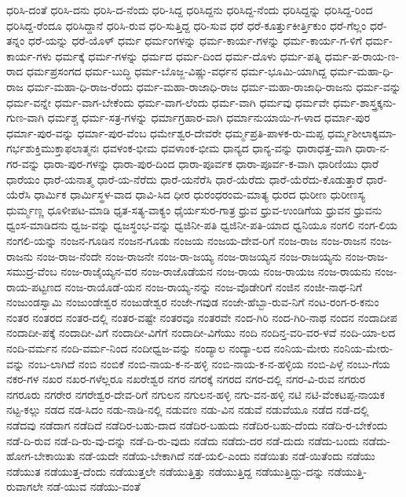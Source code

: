 {ಧರಿಸಿ-ದಂತೆ
ಧರಿಸಿ-ದನು
ಧರಿಸಿ-ದ-ನೆಂದು
ಧರಿ-ಸಿದ್ದ
ಧರಿಸಿದ್ದನು
ಧರಿಸಿದ್ದ-ನೆಂದು
ಧರಿಸಿದ್ದನ್ನು
ಧರಿಸಿದ್ದ-ರಿಂದ
ಧರಿಸಿದ್ದ-ರೆಂದೂ
ಧರಿಸಿದ್ದಾನೆ
ಧರಿಸಿ-ರುವ
ಧರಿ-ಸುತ್ತಿದ್ದ
ಧರಿ-ಸುವ
ಧರೆ
ಧರೆ-ಕೂರ್ತ್ತುಕೀರ್ತ್ತಿಕುಂ
ಧರೆ-ಗೆಲ್ಲಂ
ಧರೆ-ತನ್ನಂ
ಧರೆ-ಯನ್ನು
ಧರೆ-ಯೊಳ್
ಧರ್ಮ
ಧರ್ಮಂಗಳನ್ನು
ಧರ್ಮ-ಕಾರ್ಯ-ಗಳನ್ನು
ಧರ್ಮ-ಕಾರ್ಯ-ಗ-ಳಿಗೆ
ಧರ್ಮ-ಕಾರ್ಯ-ಗಳು
ಧರ್ಮಕ್ಕೆ
ಧರ್ಮ-ಗಳನ್ನು
ಧರ್ಮದ
ಧರ್ಮ-ದಿಂದ
ಧರ್ಮ-ದೊಳು
ಧರ್ಮ-ಪತ್ನಿ
ಧರ್ಮ-ಪ-ರಾಯ-ಣ-ರಾದ
ಧರ್ಮಪ್ರಸಂಗದ
ಧರ್ಮ-ಬುದ್ಧಿ
ಧರ್ಮ-ಬೊಜ್ಜ-ವಿಷ್ಣು-ವರ್ಧನ
ಧರ್ಮ-ಭೂಮಿ-ಯಾಗಿದ್ದ
ಧರ್ಮ-ಮಹಾ-ಧಿ-ರಾಜ
ಧರ್ಮ-ಮಹಾ-ಧಿ-ರಾಜ-ರೆಂದು
ಧರ್ಮ-ಮಹಾ-ರಾಜಾಧಿ-ರಾಜ
ಧರ್ಮ-ಮಹಾ-ರಾಜಾಧಿ-ರಾಜನು
ಧರ್ಮ-ವನ್ನು
ಧರ್ಮ-ವನ್ನೇ
ಧರ್ಮ-ವಾಗ-ಬೇಕೆಂದು
ಧರ್ಮ-ವಾಗ-ಲೆಂದು
ಧರ್ಮ-ವಾಗಿ
ಧರ್ಮವು
ಧರ್ಮವೇ
ಧರ್ಮ-ಶಾಸ್ತ್ರಕ್ಕನು-ಗುಣ-ವಾಗಿ
ಧರ್ಮಶ್ಚ
ಧರ್ಮ-ಸತ್ರ-ಗಳನ್ನು
ಧರ್ಮಾಗ್ರಹಾರ-ವಾಗಿ
ಧರ್ಮಾನುಯಾಯಿ-ಗ-ಳಾದ
ಧರ್ಮಾ-ಪುರ
ಧರ್ಮಾ-ಪುರ-ವನ್ನು
ಧರ್ಮಾ-ಪುರ-ವೆಂಬ
ಧರ್ಮೇಶ್ವರ-ದೇವರೇ
ಧರ್ಮ್ಮಪ್ರತಿ-ಪಾಳಕ-ರು-ಮಪ್ಪ
ಧರ್ಮ್ಮಶೀಲಾಕ್ಕಮಾ-ಗರ್ಭಶುಕ್ತಿಮುಕ್ತಾಫಲಾತ್ಮನಃ
ಧವಳಂಕ-ಭೀಮ
ಧವಳಾಂಕ-ಭೀಮ
ಧಾನ್ಯದ
ಧಾನ್ಯ-ವನ್ನು
ಧಾರಾಧತ್ತ-ವಾಗಿ
ಧಾರಾ-ನ-ಗರ-ವನ್ನು
ಧಾರಾ-ಪುರ-ಗಳನ್ನು
ಧಾರಾ-ಪುರ-ದಿಂದ
ಧಾರಾ-ಪೂರ್ವಕ
ಧಾರಾ-ಪೂರ್ವ-ಕ-ವಾಗಿ
ಧಾರಿಣಿಯು
ಧಾರೆ
ಧಾರೆಯಂ
ಧಾರೆ-ಯನಾತ್ಮ
ಧಾರೆ-ಯ-ನೆರೆದು
ಧಾರೆ-ಯನೆರೆಸಿ
ಧಾರೆ-ಯೆರೆದು
ಧಾರೆ-ಯೆರೆದು-ಕೊಡುತ್ತಾರೆ
ಧಾರೆ-ಯೆರೆಸಿ
ಧಾರ್ಮಿಕ
ಧಾರ್ಮಿಸ್ಥಳ-ವಾದ
ಧಾವಿ-ಸಿದ
ಧೀರ
ಧುರಂಧರಂಮ-ಮಾತ್ಯ
ಧುರದ
ಧುರೀಣ
ಧುರೀಣಸ್ಯ
ಧುರ್ಮ್ಮಣ್ಣ
ಧೂಳೀಪಟ-ಮಾಡಿ
ಧೃತ-ಸತ್ಯ-ವಾಕ್ಯಂ
ಧೈರ್ಯಸುರ-ಗಾತ್ರ
ಧ್ರುವ
ಧ್ರುವ-ಉಂಡಿಗೆಯ
ಧ್ರುವನ
ಧ್ರುವನು
ಧ್ವಂಸ-ಮಾಡಿದನು
ಧ್ವಜ-ವನ್ನು
ಧ್ವಜಸ್ಥಂಭ-ವನ್ನು
ಧ್ವಜಿನೀ-ಪತಿ
ಧ್ವಜಿನೀ-ಪತಿ-ಯಾದ
ಧ್ವನಿಯೂ
ನಂಗಲಿ
ನಂಗ-ಲಿಯ
ನಂಗಲಿ-ಯನ್ನು
ನಂಜನ-ಗೂಡಿನ
ನಂಜನ-ಗೂಡು
ನಂಜಯ
ನಂಜಯ-ದೇವ-ರಿಗೆ
ನಂಜ-ರಾಜ
ನಂಜ-ರಾಜನ
ನಂಜ-ರಾಜನು
ನಂಜ-ರಾಜ-ನೆಂದೇ
ನಂಜ-ರಾಜನೇ
ನಂಜ-ರಾ-ಜಯ್ಯ
ನಂಜ-ರಾಜಯ್ಯನ
ನಂಜ-ರಾಜಯ್ಯನು
ನಂಜ-ರಾಜ-ಸಮುದ್ರ-ವೆಂಬ
ನಂಜ-ರಾಜೈಯ್ಯನ-ವರ
ನಂಜ-ರಾಜೊಡೆಯನ
ನಂಜ-ರಾಯ
ನಂಜ-ರಾಯಜ
ನಂಜ-ರಾಯನು
ನಂಜ-ರಾಯ-ಪಟ್ಟಣದ
ನಂಜ-ರಾಯೊಡೆ-ಯನ
ನಂಜ-ರಾಯ್ಯ-ನನ್ನು
ನಂಜ-ವೊಡೇರಿಗೆ
ನಂಜಿನ
ನಂಜೀ-ನಾಥ-ನಿಗೆ
ನಂಜುಂಡಸ್ವಾಮಿ
ನಂಜುಂಡೇಶ್ವರ
ನಂಜುಡೇಶ್ವರ
ನಂಜೇ-ಗವುಡ
ನಂಜೇ-ಹೆಬ್ಬಾ-ರುವ-ನಿಗೆ
ನಂಟ-ರಂಗ-ರ-ಕನುಂ
ನಂತರ
ನಂತರದ
ನಂತರ-ದಲ್ಲಿ
ನಂತರ-ವಷ್ಟೇ
ನಂತರವೂ
ನಂತರವೇ
ನಂದ-ಗಿರಿ
ನಂದ-ಗಿರಿ-ನಾಥ
ನಂದನ
ನಂದಾದೀಪ
ನಂದಾದೀ-ಪಕ್ಕೆ
ನಂದಾದೀ-ವಿಗೆ
ನಂದಾದೀ-ವಿಗೆಗೆ
ನಂದಾದೀ-ವಿಗೆಯು
ನಂದಿ
ನಂದಿನ್ತ-ವರಿ-ವರ-ಳವೆ
ನಂದಿ-ಯಾ-ಲದ
ನಂದಿ-ವರ್ಮನ
ನಂದಿ-ವರ್ಮ-ನಿಂದ
ನಂದೀಧ್ವಜ-ವನ್ನು
ನಂದ್ಯಾಲ
ನಂದ್ಯಾ-ಲದ
ನಂನಿಯ-ಮೇರು
ನಂನಿಯ-ಮೇರು-ವನ್ನು
ನಂಬ-ಲಾಗಿದೆ
ನಂಬಿ
ನಂಬಿಕೆ
ನಂಬಿ-ನಾಯ-ಕ-ನ-ಹಳ್ಳಿ
ನಂಬಿ-ನಾಯ-ಕ-ನ-ಹಳ್ಳಿಯ
ನಂಬಿ-ಪಿಳ್ಳೆ
ನಂಬು-ಗೆಯ
ನಕರ-ಗಳ
ನಖರ
ನಖರ-ಗಳೆಲ್ಲರೂ
ನಖರೇಶ್ವರ
ನಗರ
ನಗರಕ್ಕೆ
ನಗರದ
ನಗರ-ದಲ್ಲಿ
ನಗರ-ವಿ-ರುವ
ನಗರುರ
ನಗರೂರು
ನಗರೇರ
ನಗರೇಶ್ವರ-ದೇವ-ರಿಗೆ
ನಗುಲನ
ನಗುಲನ-ಹಳ್ಳಿ
ನಗು-ವನ-ಹಳ್ಳಿ
ನಟಿ
ನಟಿ-ವೆಂಕಟಪ್ಪ-ನಾಯಕ
ನಟ್ಟ-ಕಲ್ಲು
ನಡದ
ನಡ-ಸಿದಂ
ನಡು-ನಾಡಿ-ನಲ್ಲಿ
ನಡುವಣ
ನಡು-ವಿನ
ನಡುವೆ
ನಡುವೆಯೂ
ನಡೆದ
ನಡೆ-ದಲ್ಲಿ
ನಡೆದವು
ನಡೆದಾಗ
ನಡೆದಿದೆ
ನಡೆದಿರ-ಬಹು-ದಾದ
ನಡೆದಿರ-ಬಹುದು
ನಡೆದಿರ-ಬಹು-ದೆಂದು
ನಡೆದಿ-ರ-ಬೇಕೆಂದು
ನಡೆ-ದಿ-ರುವ
ನಡೆ-ದಿ-ರು-ವು-ದನ್ನು
ನಡೆ-ದಿ-ರು-ವುದು
ನಡೆದು
ನಡೆದು-ದರ
ನಡೆ-ದುದು
ನಡೆದು-ಬಂದು
ನಡೆದು-ಹೋಗ-ಬೇಕಾಯಿತು
ನಡೆ-ಯದೇ
ನಡೆಯ-ಬೇಕಾಗಿದೆ
ನಡೆ-ಯಲಿ-ಎಂದು
ನಡೆಯಿತು
ನಡೆ-ಯಿತೆಂದು
ನಡೆಯು
ನಡೆಯುತ
ನಡೆಯುತ್ತ-ದೆಂದು
ನಡೆಯುತ್ತಲೇ
ನಡೆಯುತ್ತಿತ್ತು
ನಡೆಯುತ್ತಿದ್ದ
ನಡೆಯುತ್ತಿದ್ದು-ದನ್ನು
ನಡೆಯುತ್ತಿ-ರುವಾಗಲೇ
ನಡೆ-ಯುವ
ನಡೆಯು-ವಂತೆ
}
